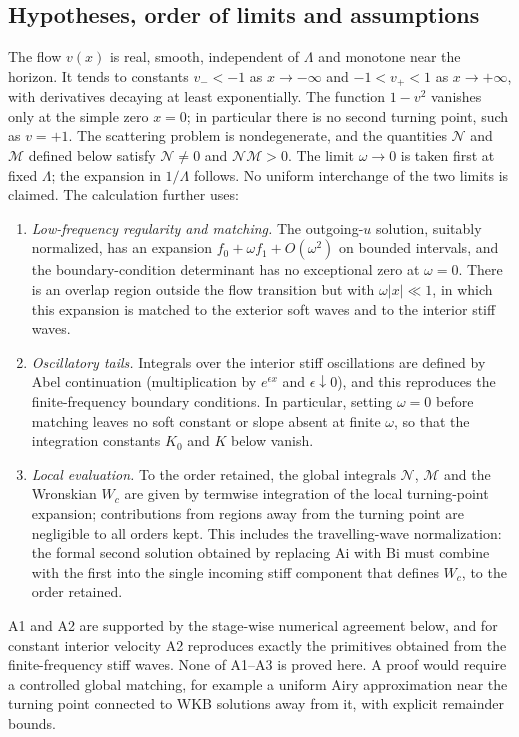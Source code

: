 \documentclass[10pt,a4paper]{article}
\newcommand{\Ai}{\mathrm{Ai}}
\newcommand{\Bi}{\mathrm{Bi}}
\begin{document}
\subsection{Hypotheses, order of limits and assumptions}
\label{sec:hyp}
The flow $v(x)$ is real, smooth, independent of $\Lambda$ and monotone near
the horizon. It tends to constants $v_-<-1$ as $x\to-\infty$ and
$-1<v_+<1$ as $x\to+\infty$, with derivatives decaying at least
exponentially. The function $1-v^2$ vanishes only at the simple zero $x=0$;
in particular there is no second turning point, such as $v=+1$. The
scattering problem is nondegenerate, and the quantities $\mathcal{N}$ and $\mathcal{M}$
defined below satisfy $\mathcal{N}\neq0$ and $\mathcal{N}\mathcal{M}>0$. The limit $\omega\to0$ is taken
first at fixed $\Lambda$; the expansion in $1/\Lambda$ follows. No uniform
interchange of the two limits is claimed. The calculation further uses:
\begin{enumerate}
\item[(A1)] \emph{Low-frequency regularity and matching.} The outgoing-$u$
solution, suitably normalized, has an expansion $f_0+\omega f_1+O(\omega^2)$
on bounded intervals, and the boundary-condition determinant has no
exceptional zero at $\omega=0$. There is an overlap region outside the
flow transition but with $\omega|x|\ll1$, in which this expansion is
matched to the exterior soft waves and to the interior stiff waves.
\item[(A2)] \emph{Oscillatory tails.} Integrals over the interior stiff
oscillations are defined by Abel continuation (multiplication by
$e^{\epsilon x}$ and $\epsilon\downarrow0$), and this reproduces the
finite-frequency boundary conditions. In particular, setting $\omega=0$
before matching leaves no soft constant or slope absent at finite
$\omega$, so that the integration constants $K_0$ and $K$ below vanish.
\item[(A3)] \emph{Local evaluation.} To the order retained, the global
integrals $\mathcal{N}$, $\mathcal{M}$ and the Wronskian $W_c$ are given by termwise
integration of the local turning-point expansion; contributions from
regions away from the turning point are negligible to all orders kept.
This includes the travelling-wave normalization: the formal second solution
obtained by replacing $\Ai$ with $\Bi$ must combine with the first into the
single incoming stiff component that defines $W_c$, to the order retained.
\end{enumerate}
A1 and A2 are supported by the stage-wise numerical agreement below, and
for constant interior velocity A2 reproduces exactly the primitives
obtained from the finite-frequency stiff waves. None of A1--A3 is proved
here. A proof would require a controlled global matching, for example a
uniform Airy approximation near the turning point connected to WKB
solutions away from it, with explicit remainder bounds.
\end{document}
